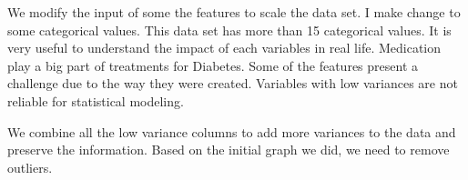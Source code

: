 \documentclass[
]{article}
\newenvironment{Shaded}{\begin{snugshade}}{\end{snugshade}}
\newcommand{\CommentTok}[1]{\textcolor[rgb]{0.56,0.35,0.01}{\textit{#1}}}
\newcommand{\DocumentationTok}[1]{\textcolor[rgb]{0.56,0.35,0.01}{\textbf{\textit{#1}}}}
\newcommand{\FunctionTok}[1]{\textcolor[rgb]{0.13,0.29,0.53}{\textbf{#1}}}
\newcommand{\NormalTok}[1]{#1}
\newcommand{\OtherTok}[1]{\textcolor[rgb]{0.56,0.35,0.01}{#1}}
\newcommand{\SpecialCharTok}[1]{\textcolor[rgb]{0.81,0.36,0.00}{\textbf{#1}}}
\begin{document}
We modify the input of some the features to scale the data set. I make
change to some categorical values. This data set has more than 15
categorical values. It is very useful to understand the impact of each
variables in real life. Medication play a big part of treatments for
Diabetes. Some of the features present a challenge due to the way they
were created. Variables with low variances are not reliable for
statistical modeling.

We combine all the low variance columns to add more variances to the
data and preserve the information. Based on the initial graph we did, we
need to remove outliers.

\begin{Shaded}
\end{Shaded}
\end{document}
